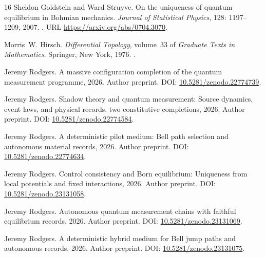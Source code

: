 \documentclass[11pt]{article}
\numberwithin{equation}{section}
\theoremstyle{definition}
\begin{document}
\begin{thebibliography}{16}
Sheldon Goldstein and Ward Struyve.
\newblock On the uniqueness of quantum equilibrium in {Bohmian} mechanics.
\newblock \emph{Journal of Statistical Physics}, 128: 1197--1209,
  2007.
\newblock {}.
\newblock URL \url{https://arxiv.org/abs/0704.3070}.

Morris~W. Hirsch.
\newblock \emph{Differential Topology}, volume~33 of \emph{Graduate Texts in
  Mathematics}.
\newblock Springer, New York, 1976.
\newblock {}.

Jeremy Rodgers.
\newblock A massive configuration completion of the quantum measurement
  programme, 2026{}.
\newblock Author preprint. DOI:
  \href{https://doi.org/10.5281/zenodo.22774739}{10.5281/zenodo.22774739}.

Jeremy Rodgers.
\newblock Shadow theory and quantum measurement: Source dynamics, event laws,
  and physical records. two constitutive completions, 2026{}.
\newblock Author preprint. DOI:
  \href{https://doi.org/10.5281/zenodo.22774584}{10.5281/zenodo.22774584}.

Jeremy Rodgers.
\newblock A deterministic pilot medium: Bell path selection and autonomous
  material records, 2026{}.
\newblock Author preprint. DOI:
  \href{https://doi.org/10.5281/zenodo.22774634}{10.5281/zenodo.22774634}.

Jeremy Rodgers.
\newblock Control consistency and {Born} equilibrium: Uniqueness from local
  potentials and fixed interactions, 2026{}.
\newblock Author preprint. DOI:
  \href{https://doi.org/10.5281/zenodo.23131058}{10.5281/zenodo.23131058}.

Jeremy Rodgers.
\newblock Autonomous quantum measurement chains with faithful equilibrium
  records, 2026{}.
\newblock Author preprint. DOI:
  \href{https://doi.org/10.5281/zenodo.23131069}{10.5281/zenodo.23131069}.

Jeremy Rodgers.
\newblock A deterministic hybrid medium for {Bell} jump paths and autonomous
  records, 2026{}.
\newblock Author preprint. DOI:
  \href{https://doi.org/10.5281/zenodo.23131075}{10.5281/zenodo.23131075}.


\end{thebibliography}
\end{document}
